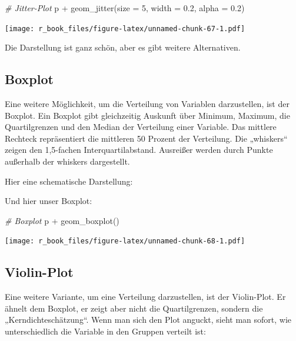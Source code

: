 \documentclass[
]{book}
\newenvironment{Shaded}{\begin{snugshade}}{\end{snugshade}}
\newcommand{\AttributeTok}[1]{\textcolor[rgb]{0.77,0.63,0.00}{#1}}
\newcommand{\CommentTok}[1]{\textcolor[rgb]{0.56,0.35,0.01}{\textit{#1}}}
\newcommand{\DecValTok}[1]{\textcolor[rgb]{0.00,0.00,0.81}{#1}}
\newcommand{\FloatTok}[1]{\textcolor[rgb]{0.00,0.00,0.81}{#1}}
\newcommand{\FunctionTok}[1]{\textcolor[rgb]{0.00,0.00,0.00}{#1}}
\newcommand{\NormalTok}[1]{#1}
\newcommand{\SpecialCharTok}[1]{\textcolor[rgb]{0.00,0.00,0.00}{#1}}
\begin{document}
\begin{Shaded}
\begin{Highlighting}[]
\CommentTok{\# Jitter{-}Plot}
\NormalTok{p }\SpecialCharTok{+} \FunctionTok{geom\_jitter}\NormalTok{(}\AttributeTok{size =} \DecValTok{5}\NormalTok{, }\AttributeTok{width =} \FloatTok{0.2}\NormalTok{, }\AttributeTok{alpha =} \FloatTok{0.2}\NormalTok{)}
\end{Highlighting}
\end{Shaded}

\texttt{[image: r\_book\_files/figure-latex/unnamed-chunk-67-1.pdf]}

Die Darstellung ist ganz schön, aber es gibt weitere Alternativen.

\hypertarget{boxplot}{%
\subsection{Boxplot}\label{boxplot}}

Eine weitere Möglichkeit, um die Verteilung von Variablen darzustellen, ist der Boxplot. Ein Boxplot gibt gleichzeitig Auskunft über Minimum, Maximum, die Quartilgrenzen und den Median der Verteilung einer Variable. Das mittlere Rechteck repräsentiert die mittleren 50 Prozent der Verteilung. Die „whiskers`` zeigen den 1,5-fachen Interquartilabstand. Ausreißer werden durch Punkte außerhalb der whiskers dargestellt.

Hier eine schematische Darstellung:

Und hier unser Boxplot:

\begin{Shaded}
\begin{Highlighting}[]
\CommentTok{\# Boxplot}
\NormalTok{p }\SpecialCharTok{+} \FunctionTok{geom\_boxplot}\NormalTok{()}
\end{Highlighting}
\end{Shaded}

\texttt{[image: r\_book\_files/figure-latex/unnamed-chunk-68-1.pdf]}

\hypertarget{violin-plot}{%
\subsection{Violin-Plot}\label{violin-plot}}

Eine weitere Variante, um eine Verteilung darzustellen, ist der Violin-Plot. Er ähnelt dem Boxplot, er zeigt aber nicht die Quartilgrenzen, sondern die „Kerndichteschätzung``. Wenn man sich den Plot anguckt, sieht man sofort, wie unterschiedlich die Variable in den Gruppen verteilt ist:
\end{document}
